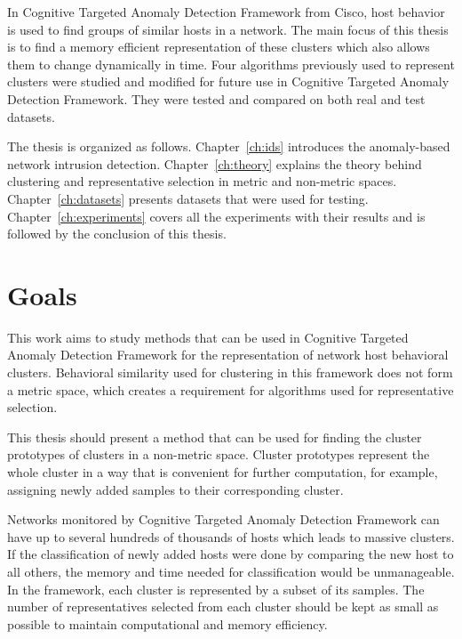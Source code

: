 \documentclass[thesis=B,english]{FITthesis}[2012/10/20]
\begin{document}
In Cognitive Targeted Anomaly Detection Framework from Cisco, host behavior is used to find groups of similar hosts in a network.
The main focus of this thesis is to find a memory efficient representation of these clusters which also allows them to change dynamically in time.
Four algorithms previously used to represent clusters were studied and modified for future use in Cognitive Targeted Anomaly Detection Framework.
They were tested and compared on both real and test datasets.

The thesis is organized as follows.
Chapter~\ref{ch:ids} introduces the anomaly-based network intrusion detection.
Chapter~\ref{ch:theory} explains the theory behind clustering and representative selection in metric and non-metric spaces.
Chapter~\ref{ch:datasets} presents datasets that were used for testing.
Chapter~\ref{ch:experiments} covers all the experiments with their results and is followed by the conclusion of this thesis.


\chapter{Goals}

This work aims to study methods that can be used in Cognitive Targeted Anomaly Detection Framework for the representation of network host behavioral clusters.
Behavioral similarity used for clustering in this framework does not form a metric space, which creates a requirement for algorithms used for representative selection.

This thesis should present a method that can be used for finding the cluster prototypes of clusters in a non-metric space.
Cluster prototypes represent the whole cluster in a way that is convenient for further computation, for example, assigning newly added samples to their corresponding cluster.

Networks monitored by Cognitive Targeted Anomaly Detection Framework can have up to several hundreds of thousands of hosts which leads to massive clusters.
If the classification of newly added hosts were done by comparing the new host to all others, the memory and time needed for classification would be unmanageable.
In the framework, each cluster is represented by a subset of its samples.
The number of representatives selected from each cluster should be kept as small as possible to maintain computational and memory efficiency.
\end{document}
